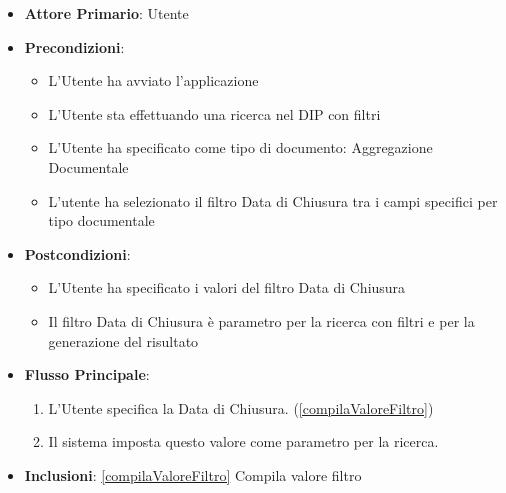 \begin{itemize}
      \item \textbf{Attore Primario}: Utente
      \item \textbf{Precondizioni}: 
      \begin{itemize}
            \item L'Utente ha avviato l'applicazione
            \item L'Utente sta effettuando una ricerca nel DIP con filtri
            \item L'Utente ha specificato come tipo di documento: Aggregazione Documentale
            \item L'utente ha selezionato il filtro Data di Chiusura tra i campi specifici per tipo documentale
      \end{itemize}
      \item \textbf{Postcondizioni}: \begin{itemize}
            \item L'Utente ha specificato i valori del filtro Data di Chiusura
            \item Il filtro Data di Chiusura è parametro per la ricerca con filtri e per la generazione del risultato
      \end{itemize}
      \item \textbf{Flusso Principale}:
            \begin{enumerate}
                  \item L'Utente specifica la Data di Chiusura. (\ref{compilaValoreFiltro})
                  \item Il sistema imposta questo valore come parametro per la ricerca.
            \end{enumerate}
      \item \textbf{Inclusioni}: \ref{compilaValoreFiltro} Compila valore filtro
\end{itemize}

